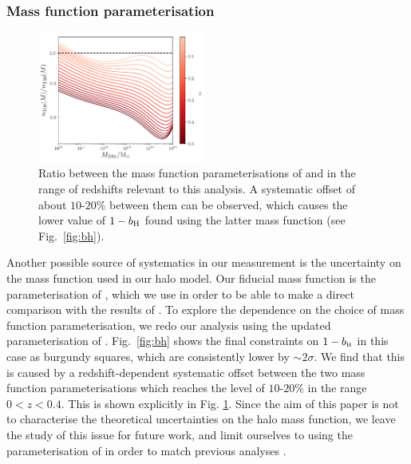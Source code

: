 \documentclass[useAMS,usenatbib]{mn2e}
\def\bH{b_{\scriptscriptstyle\rm H}}
\begin{document}
    \subsubsection{Mass function parameterisation}\label{sssec:results.syst.mf}
      \begin{figure}
        \centering
        \includegraphics[width=0.49\textwidth]{mf_ratio.pdf}
        \caption{Ratio between the mass function parameterisations of \citet{2008ApJ...688..709T} and \citet{2010ApJ...724..878T} in the range of redshifts relevant to this analysis. A systematic offset of about $10$-$20\%$ between them can be observed, which causes the lower value of $1-b_{\rm H}$ found using the latter mass function (see Fig.\!~\ref{fig:bh}). }
        \label{fig:mf_ratio}
      \end{figure}
      Another possible source of systematics in our measurement is the uncertainty on the mass function used in our halo model. Our fiducial mass function is the parameterisation of \cite{2008ApJ...688..709T}, which we use in order to be able to make a direct comparison with the results of \cite{2016A&A...594A..24P}. To explore the dependence on the choice of mass function parameterisation, we redo our analysis using the updated parameterisation of \cite{2010ApJ...724..878T}. Fig.\!~\ref{fig:bh} shows the final constraints on $1-\bH$ in this case as burgundy squares, which are consistently lower by $\sim 2\sigma$. We find that this is caused by a redshift-dependent systematic offset between the two mass function parameterisations which reaches the level of $10$-$20\%$ in the range $0<z<0.4$. This is shown explicitly in Fig. \ref{fig:mf_ratio}. Since the aim of this paper is not to characterise the theoretical uncertainties on the halo mass function, we leave the study of this issue for future work, and limit ourselves to using the parameterisation of \cite{2008ApJ...688..709T} in order to match previous analyses \citep[e.g.][]{2016A&A...594A..24P,2018MNRAS.477.4957B,2018MNRAS.473.4318A,2019MNRAS.489..401Z,2019arXiv190707870M}.
\end{document}
